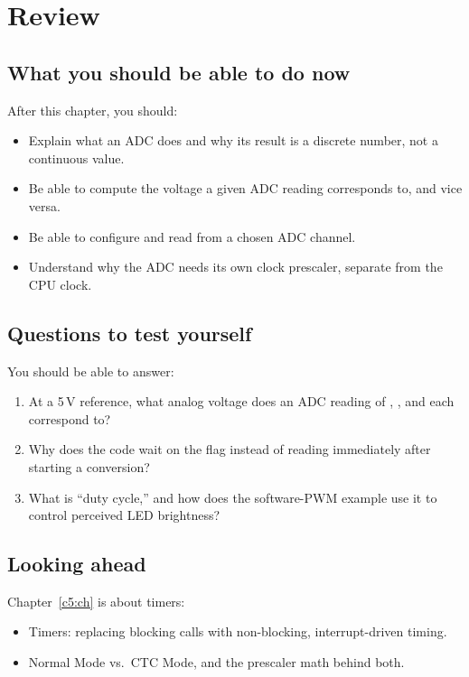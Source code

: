 
\section{Review}
\label{c4:sec:review}

\subsection*{What you should be able to do now}
After this chapter, you should:
\begin{itemize}
  \item Explain what an ADC does and why its result is a discrete number, not a continuous value.
  \item Be able to compute the voltage a given ADC reading corresponds to, and vice versa.
  \item Be able to configure and read from a chosen ADC channel.
  \item Understand why the ADC needs its own clock prescaler, separate from the CPU clock.
\end{itemize}

\subsection*{Questions to test yourself}
You should be able to answer:
\begin{enumerate}
  \item At a 5\,V reference, what analog voltage does an ADC reading of , , and
     each correspond to?
  \item Why does the code wait on the  flag instead of reading  immediately
    after starting a conversion?
  \item What is ``duty cycle,'' and how does the software-PWM example use it to control perceived
    LED brightness?
\end{enumerate}

\subsection*{Looking ahead}
Chapter~\ref{c5:ch} is about timers:
\begin{itemize}
  \item Timers: replacing blocking  calls with non-blocking, interrupt-driven
    timing.
  \item Normal Mode vs.\ CTC Mode, and the prescaler math behind both.
\end{itemize}
